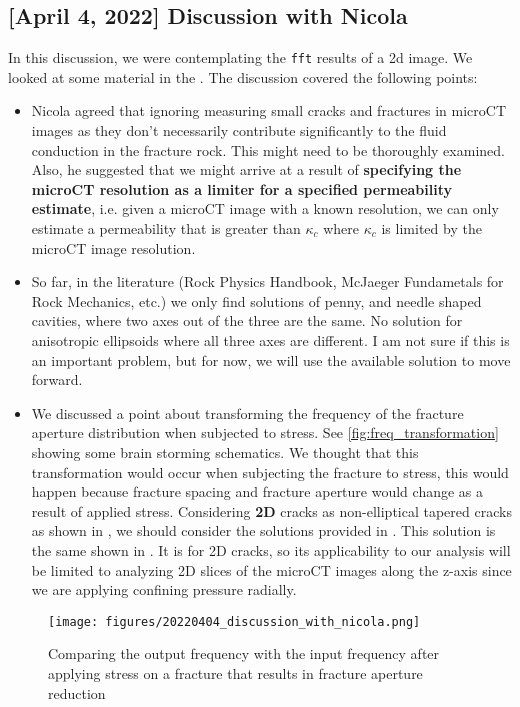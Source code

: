 \documentclass[12pt,titlepage]{article}
\begin{document}
\subsection{[April 4, 2022] Discussion with Nicola}
In this discussion, we were contemplating the \texttt{fft} results of a 2d image. We looked at some material in the \cite[see pages 63-66]{Mavko2009}. The discussion covered the following points: 
\begin{itemize}
\item Nicola agreed that ignoring measuring small cracks and fractures in microCT images as they don't necessarily contribute significantly to the fluid conduction in the fracture rock. This might need to be thoroughly examined. Also, he suggested that we might arrive at a result of \textbf{specifying the microCT resolution as a limiter for a specified permeability estimate}, i.e. given a microCT image with a known resolution, we can only estimate a permeability that is greater than $\kappa_c$ where $\kappa_c$ is limited by the microCT image resolution.
\item So far, in the literature (Rock Physics Handbook, McJaeger Fundametals for Rock Mechanics, etc.) we only find solutions of penny, and needle shaped cavities, where two axes out of the three are the same. No solution for anisotropic ellipsoids where all three axes are different. I am not sure if this is an important problem, but for now, we will use the available solution to move forward.
\item We discussed a point about transforming the frequency of the fracture aperture distribution when subjected to stress. See \autoref{fig:freq_transformation} showing some brain storming schematics. We thought that this transformation would occur when subjecting the fracture to stress, this would happen because fracture spacing and fracture aperture would change as a result of applied stress. Considering \textbf{2D} cracks as non-elliptical tapered cracks as shown in \cite[Table 2.9.1 page 64, and Figure 2.9.2 page 66]{Mavko2009}, we should consider the solutions provided in \cite{Mavko1978}. This solution is the same shown in \cite[see pages 63-66]{Mavko2009}. It is for 2D cracks, so its applicability to our analysis will be limited to analyzing 2D slices of the microCT images along the z-axis since we are applying confining pressure radially.

\end{itemize}

\begin{figure}
\centering
\texttt{[image: figures/20220404\_discussion\_with\_nicola.png]}
\caption{Comparing the output frequency with the input frequency after applying stress on a fracture that results in fracture aperture reduction}
\label{fig:freq_transformation}
\end{figure}
\end{document}
